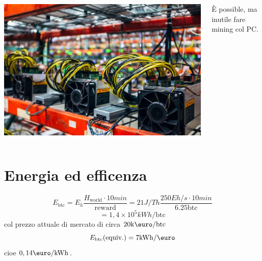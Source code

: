 \documentclass{beamer}
\renewcommand\texteuro{\hbox{\euro}}
\begin{document}
\begin{frame}{\insertsection}
    \begin{columns}
        \begin{column}{0.7\textwidth}
            \includegraphics[width=\textwidth]{images/bitcoin-mining-pool.jpg}
        \end{column}
        \begin{column}{0.3\textwidth}
            \begin{block}{}
                \small
                \`E possible, ma inutile fare mining col PC.
            \end{block}
        \end{column}
    \end{columns}
\end{frame}

\section{Energia ed efficenza}

\begin{frame}{\insertsection}
\[
    E_{\mathrm{btc}}
    = E_h \frac{H_{\mathrm{world}} \cdot 10 \si{min}}{\mathrm{reward}}
    = 21\si{J/Th} \frac{250 \si{Eh/s} \cdot 10 \si{min}}{6.25 \mathrm{btc}}
\]
\[
    = 1,4 \times 10^5 \si{kWh}/\mathrm{btc}
\]
col prezzo attuale di mercato di circa $20 \si{k} \texteuro/\mathrm{btc}$
\[
    E_{\mathrm{btc}} \text{(equiv.)} 
    = 7 \si{kWh}/ \texteuro
\]
cioe $0,14 \texteuro / \si{kWh} $.

\end{frame}
\end{document}
